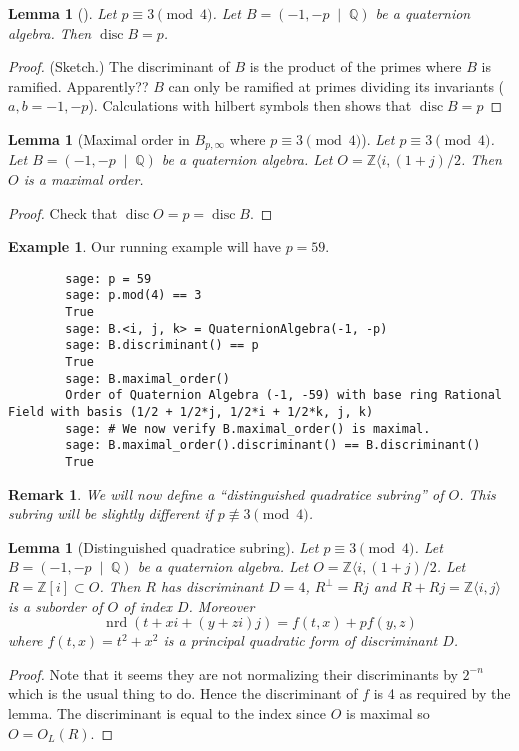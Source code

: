 \documentclass[10pt]{article}
\theoremstyle{plain}
\newtheorem{lemma}[theorem]{Lemma}
\newtheorem{remark}[theorem]{Remark}
\theoremstyle{definition}
\newtheorem{example}[theorem]{Example}
\newcommand{\op}{\operatorname}
\newcommand{\Z}{\mathbb{Z}}
\newcommand{\Q}{\mathbb{Q}}
\newcommand{\nrd}{\op{nrd}}
\newcommand{\disc}{\op{disc}}
\begin{document}
\begin{lemma}[]
    Let \( p \equiv 3 \pmod{4} \).
    Let \( B =  (-1, -p \; \mid \; \Q) \) be a quaternion algebra.
    Then \( \disc B = p \).
\end{lemma}
\begin{proof}
    (Sketch.)
    The discriminant of \( B \) is the product of the primes where \( B \) is ramified.
    Apparently?? \( B \) can only be ramified at primes dividing its invariants (\( a, b = -1, -p\)).
    Calculations with hilbert symbols then shows that \( \disc B = p \)
\end{proof}

\begin{lemma}[Maximal order in \( B_{p, \infty} \) where \( p \equiv 3 \pmod{4} \)]
    Let \( p \equiv 3 \pmod{4} \).
    Let \( B =  (-1, -p \; \mid \; \Q) \) be a quaternion algebra.
    Let \( O = \Z \langle i, (1+j) / 2 \).
    Then \( O \) is a maximal order.
\end{lemma}
\begin{proof}
    Check that \( \disc O  = p = \disc B\).
\end{proof}

\begin{example}
    Our running example will have \( p = 59 \).
    \begin{lstlisting}
        sage: p = 59
        sage: p.mod(4) == 3
        True 
        sage: B.<i, j, k> = QuaternionAlgebra(-1, -p)
        sage: B.discriminant() == p
        True
        sage: B.maximal_order()
        Order of Quaternion Algebra (-1, -59) with base ring Rational Field with basis (1/2 + 1/2*j, 1/2*i + 1/2*k, j, k)
        sage: # We now verify B.maximal_order() is maximal.
        sage: B.maximal_order().discriminant() == B.discriminant()
        True
    \end{lstlisting}
\end{example}

\begin{remark}
    We will now define a ``distinguished quadratice subring'' of \( O \).
    This subring will be slightly different if \( p \not\equiv 3 \pmod{4} \).
\end{remark}

\begin{lemma}[Distinguished quadratice subring]
    Let \( p \equiv 3 \pmod{4} \).
    Let \( B =  (-1, -p \; \mid \; \Q) \) be a quaternion algebra.
    Let \( O = \Z \langle i, (1+j) / 2 \).
    Let \( R = \Z[i] \subset O \).
    Then \( R \) has discriminant \( D = 4 \), \( R^\perp = Rj \) and \( R + Rj = \Z\langle i, j \rangle\) is a suborder of \( O \) of index \( D \).
    Moreover
    \[
        \nrd(t + xi + (y + zi)j) = f(t, x) + p f(y, z)
    \]
    where \( f(t, x) = t^2 + x^2 \) is a principal quadratic form of discriminant \( D \).
\end{lemma}
\begin{proof}
    Note that it seems they are not normalizing their discriminants by \( 2^{-n} \) which is the usual thing to do.
    Hence the discriminant of \( f \) is 4 as required by the lemma.
    The discriminant is equal to the index since \( O \) is maximal so \( O = O_L(R) \).
\end{proof}
\end{document}
